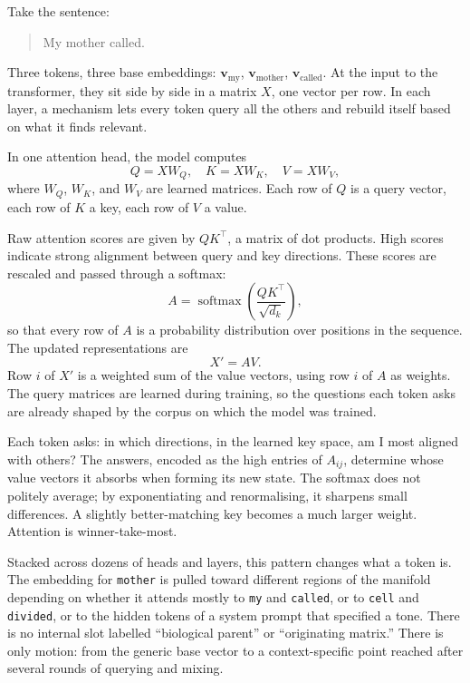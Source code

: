 \documentclass[12pt,a4paper]{article}
\begin{document}
Take the sentence:

\begin{quote}
My mother called.
\end{quote}

Three tokens, three base embeddings: $\mathbf{v}_{\text{my}}$, $\mathbf{v}_{\text{mother}}$, $\mathbf{v}_{\text{called}}$. At the input to the transformer, they sit side by side in a matrix $X$, one vector per row. In each layer, a mechanism lets every token query all the others and rebuild itself based on what it finds relevant.

\begin{formalbox}[title={Asking, answering, moving}]
In one attention head, the model computes
\[
Q = XW_Q,\quad K = XW_K,\quad V = XW_V,
\]
where $W_Q$, $W_K$, and $W_V$ are learned matrices. Each row of $Q$ is a query vector, each row of $K$ a key, each row of $V$ a value.

Raw attention scores are given by $QK^\top$, a matrix of dot products. High scores indicate strong alignment between query and key directions. These scores are rescaled and passed through a softmax:
\[
A = \operatorname{softmax}\!\left(\frac{QK^\top}{\sqrt{d_k}}\right),
\]
so that every row of $A$ is a probability distribution over positions in the sequence. The updated representations are
\[
X' = AV.
\]
Row $i$ of $X'$ is a weighted sum of the value vectors, using row $i$ of $A$ as weights. The query matrices are learned during training, so the questions each token asks are already shaped by the corpus on which the model was trained.
\end{formalbox}

Each token asks: in which directions, in the learned key space, am I most aligned with others? The answers, encoded as the high entries of $A_{ij}$, determine whose value vectors it absorbs when forming its new state. The softmax does not politely average; by exponentiating and renormalising, it sharpens small differences. A slightly better-matching key becomes a much larger weight. Attention is winner-take-most.

Stacked across dozens of heads and layers, this pattern changes what a token is. The embedding for \texttt{mother} is pulled toward different regions of the manifold depending on whether it attends mostly to \texttt{my} and \texttt{called}, or to \texttt{cell} and \texttt{divided}, or to the hidden tokens of a system prompt that specified a tone. There is no internal slot labelled ``biological parent'' or ``originating matrix.'' There is only motion: from the generic base vector to a context-specific point reached after several rounds of querying and mixing.
\end{document}
